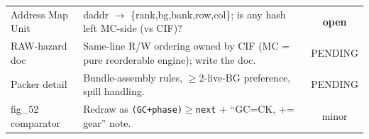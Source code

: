 \documentclass[10pt]{article}
\newcommand{\op}[1]{\textbf{\textcolor{open}{#1}}}
\begin{document}
{\begin{longtable}{B P S}
\\
\midrule
Address Map Unit   & daddr $\to$ \{rank,bg,bank,row,col\}; is any hash left MC-side (vs CIF)? & \op{open}\\
RAW-hazard doc     & Same-line R/W ordering owned by CIF (MC = pure reorderable engine); write the doc. & PENDING\\
Packer detail      & Bundle-assembly rules, $\geq$2-live-BG preference, spill handling. & PENDING\\
fig\_52 comparator & Redraw as \texttt{(GC+phase)$\geq$next} + ``GC=CK, += gear'' note. & minor\\
\bottomrule
\end{longtable}
}
\end{document}

